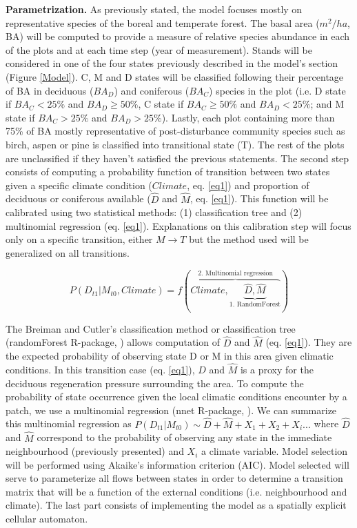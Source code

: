 \textbf{Parametrization.} As previously stated, the model focuses mostly on
representative species of the boreal and temperate forest. The basal area
($m^2/ha$, BA) will be computed to provide a measure of relative species
abundance in each of the plots and at each time step (year of measurement).
Stands will be considered in one of the four states previously described in
the model's section (Figure \ref{Model}). C, M and D states will be classified
following their percentage of BA in deciduous ($BA_D$) and coniferous ($BA_C$)
species in the plot (i.e. D state if $BA_C < 25\%$ and $BA_D \geq 50\%$, C
state if ${BA}_C \geq 50\%$ and $BA_D < 25\%$; and M state if $BA_C > 25\%$
and $BA_D > 25\%$). Lastly, each plot containing more than 75\% of BA mostly
representative of post-disturbance community species such as birch, aspen or
pine is classified into transitional state (T). The rest of the plots are
unclassified if they haven't satisfied the previous statements. The second
step consists of computing a probability function of transition between two
states given a specific climate condition ($Climate$, eq. \ref{eq1}) and
proportion of deciduous or coniferous available ($\hat{D}$ and $\hat{M}$, eq.
\ref{eq1}). This function will be calibrated using two statistical methods:
(1) classification tree and (2) multinomial regression (eq. \ref{eq1}).
Explanations on this calibration step will focus only on a specific
transition, either $M \rightarrow T$ but the method used will be generalized
on all transitions.

\begin{equation}
	P(D_{t1}|M_{t0}, Climate) = f(\overbrace{Climate, \underbrace{\hat{D}, \hat{M}}_\text{1. RandomForest}}^\text{2. Multinomial regression})
\label{eq1}
\end{equation}


The Breiman and Cutler's classification method or classification tree
(randomForest R-package, \cite{Liaw2002a}) allows computation of $\hat{D}$ and
$\hat{M}$ (eq. \ref{eq1}). They are the expected probability of observing
state D or M in this area given climatic conditions. In this transition case
(eq. \ref{eq1}), $\hat{D}$ and $\hat{M}$ is a proxy for the deciduous
regeneration pressure surrounding the area. To compute the probability of
state occurrence given the local climatic conditions encounter by a patch, we
use a multinomial regression (nnet R-package, \cite{Venables2002}). We can
summarize this multinomial regression as $P(D_{t1}|M_{t0}) \sim \hat{D} +
\hat{M} + X_1+X_2+X_i... $ where $\hat{D}$ and $\hat{M}$ correspond to the
probability of observing any state in the immediate neighbourhood (previously
presented) and $X_i$ a climate variable. Model selection will be performed using
Akaike's information criterion (AIC). Model selected will serve to parameterize
all flows between states in order to determine a transition matrix that will
be a function of the external conditions (i.e. neighbourhood and climate). 
The last part consists of implementing the model as a spatially explicit cellular
automaton. 

